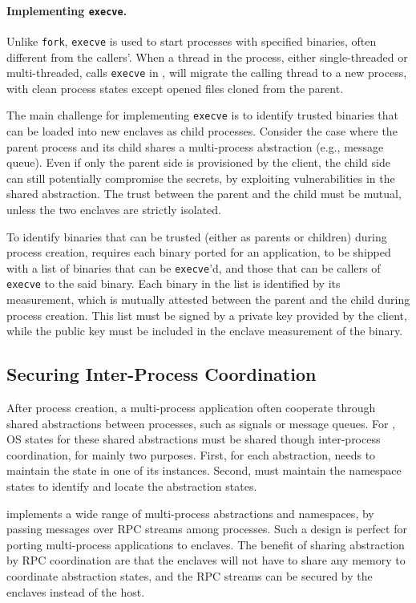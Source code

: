 \paragraph{Implementing {\tt execve}.}
Unlike {\tt fork}, {\tt execve} is used to
start processes with specified binaries, often different from the callers'.
When a thread in the process, either single-threaded or multi-threaded,
calls {\tt execve} in \sysname{},
\libos{} will migrate the calling thread to a new process,
with clean process states except opened files cloned from the parent.

The main challenge for implementing {\tt execve} is to
identify trusted binaries that can be loaded into new enclaves as child processes.
Consider the case where the parent process and its child shares
a multi-process abstraction (e.g., message queue).
Even if only the parent side is provisioned by the client, the child side
can still potentially compromise the secrets,
by exploiting vulnerabilities in the shared abstraction.
The trust between the parent and the child must be mutual,
unless the two enclaves are strictly isolated.

To identify binaries that can be trusted (either as parents or children)
during process creation,
\sysname{} requires each binary ported for an application,
to be shipped with a list of binaries that can be {\tt execve}'d,
and those that can be callers of {\tt execve} to the said binary.
Each binary in the list is identified by its measurement, which is mutually attested
between the parent and the child during process creation.
This list must be signed by a private key provided by the client,
while the public key must be included in the enclave measurement of the binary.

\subsection{Securing Inter-Process Coordination}
\label{sec:multiproc:ipc}

After process creation, a multi-process application often cooperate
through shared abstractions between processes,
such as signals or message queues.
For \libos{}, OS states for these shared abstractions must be shared
though inter-process coordination, for mainly two purposes.
First, for each abstraction, \libos{} needs to maintain the state
in one of its instances.
Second, \libos{} must maintain the namespace states to identify and locate the
abstraction states.

\graphene{} implements a wide range of multi-process abstractions and namespaces,
by passing messages over RPC streams among processes.
Such a design is perfect for porting multi-process applications to enclaves.
The benefit of sharing abstraction by RPC coordination are that
the enclaves will not have to share any memory to
coordinate abstraction states,
and the RPC streams can be secured by the enclaves instead of the host.


